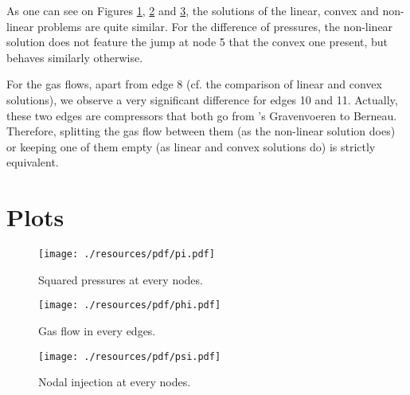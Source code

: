 \documentclass[a4paper, 12pt]{article}
\begin{document}
As one can see on Figures \ref{fig:pi}, \ref{fig:phi} and \ref{fig:psi}, the solutions of the linear, convex and non-linear problems are quite similar. For the difference of pressures, the non-linear solution does not feature the \og{}jump\fg{} at node 5 that the convex one present, but behaves similarly otherwise.

For the gas flows, apart from edge 8 (cf. the comparison of linear and convex solutions), we observe a very significant difference for edges 10 and 11. Actually, these two edges are compressors that 
both go from \og{}'s Gravenvoeren\fg{} to \og{}Berneau\fg{}. Therefore, splitting the gas flow between them (as the non-linear solution does) or keeping one of them empty (as linear and convex solutions do) is strictly equivalent.

\appendix

\section{Plots}

\begin{figure}[h]
    \centering
    \texttt{[image: ./resources/pdf/pi.pdf]}
    \caption{Squared pressures at every nodes.}
    \label{fig:pi}
\end{figure}

\begin{figure}[h]
    \centering
    \texttt{[image: ./resources/pdf/phi.pdf]}
    \caption{Gas flow in every edges.}
    \label{fig:phi}
\end{figure}

\begin{figure}[h]
    \centering
    \texttt{[image: ./resources/pdf/psi.pdf]}
    \caption{Nodal injection at every nodes.}
    \label{fig:psi}
\end{figure}
\end{document}
